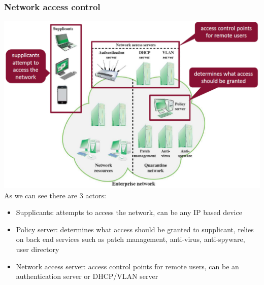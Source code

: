 \documentclass[12pt]{article}
\begin{document}
 \subsubsection{Network access control}
 \includegraphics[width=\linewidth]{./slides/L6P2NAC.PNG}\\
 As we can see there are 3 actors:
 \begin{itemize}
 	\item Supplicants: attempts to access the network, can be any IP based device
 	\item Policy server: determines what access should be granted to supplicant, relies on back end services such as patch management, anti-virus, anti-spyware, user directory
 	\item Network access server: access control points for remote users, can be an authentication server or DHCP/VLAN server
 \end{itemize}
 
\end{document}

